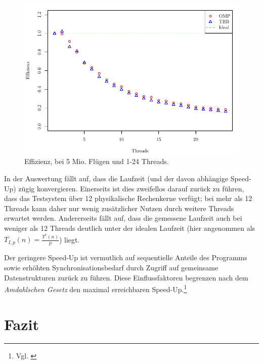 \documentclass[11pt]{scrartcl}
\begin{document}
\begin{figure}[pbt]
\centering
\includegraphics{../messdaten/s13_efficiency.pdf}
\caption{Effizienz, bei 5 Mio. Flügen und 1-24 Threads.}
\label{s13_efficiency}
\end{figure}

In der Auswertung fällt auf, dass die Laufzeit (und der davon abhängige Speed-Up) zügig konvergieren. Einerseits ist
dies zweifellos darauf zurück zu führen, dass das Testsystem über 12 physikalische Rechenkerne verfügt; bei mehr
als 12 Threads kann daher nur wenig zusätzlicher Nutzen durch weitere Threads erwartet werden. Andererseits fällt auf,
dass die gemessene Laufzeit auch bei weniger als 12 Threads deutlich unter der idealen Laufzeit (hier angenommen als
$T_{I,p}(n) = \frac{T^*(n)}{p}$) liegt.

Der geringere Speed-Up ist vermutlich auf sequentielle Anteile des Programms sowie erhöhten Synchronisationsbedarf durch
Zugriff auf gemeinsame Datenstrukturen zurück zu führen. Diese Einflussfaktoren begrenzen nach dem \emph{Amdahlschen
Gesetz} den maximal erreichbaren Speed-Up.\footnote{Vgl. \cite[S.~318]{bengel_masterkurs_2008}}



\section{Fazit}
\end{document}

